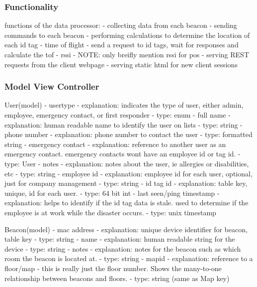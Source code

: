 


\subsubsection{Functionality}
functions of the data processor:
	- collecting data from each beacon
	- sending commands to each beacon
	- performing calculations to determine the location of each id tag
		- time of flight
			- send a request to id tags, wait for responses and calculate the tof
		- rssi
			- NOTE: only breifly mention rssi for pos
	- serving REST requests from the client webpage
	- serving static html for new client sessions

\subsubsection{Model View Controller}

User(model)
	- usertype
		- explanation: indicates the type of user, either admin, employee, emergency contact, or first responder
		- type: enum
	- full name
		- explanation: human readable name to identify the user on lists
		- type: string
	- phone number
		- explanation: phone number to contact the user
		- type: formatted string
	- emergency contact
		- explanation: reference to another user as an emergency contact. emergency contacts wont have an employee id or tag id.
		- type: User
	- notes
		- explanation: notes about the user, ie allergies or disabilities, etc
		- type: string
	- employee id
		- explanation: employee id for each user, optional, just for company management
		- type: string
	- id tag id
		- explanation: table key, unique, id for each user.
		- type: 64 bit int
	- last seen/ping timestamp
		- explanation: helps to identify if the id tag data is stale. used to determine if the employee is at work while the disaster occurs.
		- type: unix timestamp

Beacon(model)
	- mac address
		- explanation: unique device identifier for beacon, table key
		- type: string
	- name
		- explanation: human readable string for the device
		- type: string
	- notes
		- explanation: notes for the beacon such as which room the beacon is located at.
		- type: string
	- mapid
		- explanation: reference to a floor/map - this is really just the floor number. Shows the many-to-one relationship between beacons and floors.
		- type: string (same as Map key)


